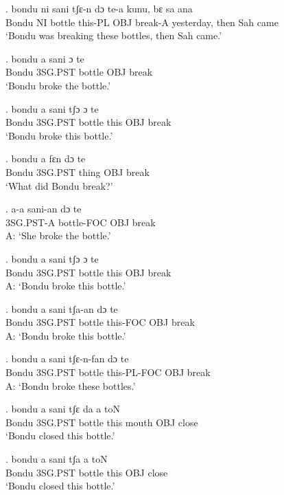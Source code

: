 \documentclass{assets/fieldnotes}
\begin{document}
\exg.
bondu   ni   sani     tʃɛ-n     dɔ    te-a      kunu,        bɛ     sa    ana  \\
Bondu   NI   bottle   this-PL   OBJ   break-A   yesterday,   then   Sah   came \\%
`Bondu was breaking these bottles, then Sah came.'

\exg.
bondu   a   sani     ɔ     te    \\
Bondu   3SG.PST   bottle   OBJ   break \\%
`Bondu broke the bottle.'

\exg.
bondu   a   sani     tʃɔ    ɔ     te    \\
Bondu   3SG.PST   bottle   this   OBJ   break \\%
`Bondu broke this bottle.'

\exg.
bondu   a   fɛn     dɔ    te    \\
Bondu   3SG.PST   thing   OBJ   break \\%
`What did Bondu break?'

\exg.
a-a      sani-an      dɔ    te    \\
3SG.PST-A   bottle-FOC   OBJ   break \\%
A: `She broke the bottle.'

\exg.
bondu   a   sani     tʃɔ    ɔ     te    \\
Bondu   3SG.PST   bottle   this   OBJ   break \\%
A: `Bondu broke this bottle.'

\exg.
bondu   a   sani     tʃa-an     dɔ    te    \\
Bondu   3SG.PST   bottle   this-FOC   OBJ   break \\%
A: `Bondu broke this bottle.'

\exg.
bondu   a   sani     tʃɛ-n-fan     dɔ    te    \\
Bondu   3SG.PST   bottle   this-PL-FOC   OBJ   break \\%
A: `Bondu broke these bottles.'

\exg.
bondu   a   sani     tʃɛ    da      a     toN   \\
Bondu   3SG.PST   bottle   this   mouth   OBJ   close \\%
`Bondu closed this bottle.'

\exg.
bondu   a   sani     tʃa    a     toN   \\
Bondu   3SG.PST   bottle   this   OBJ   close \\%
`Bondu closed this bottle.'

\end{document}
